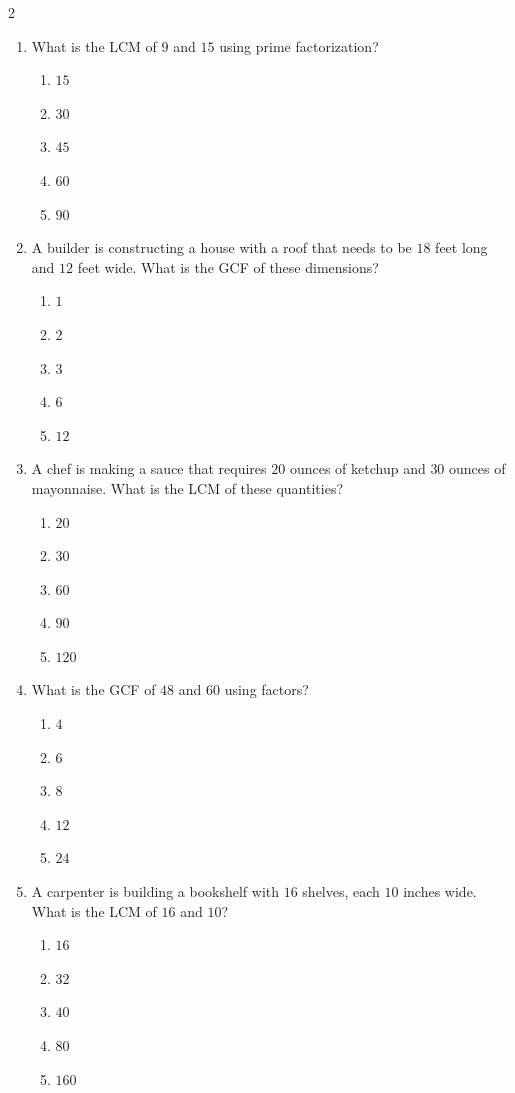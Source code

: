 \documentclass[10pt]{article}
\begin{document}
\begin{multicols}{2}
\begin{enumerate}[label=\textbf{Q\arabic*.}, leftmargin=*, itemsep=6pt, parsep=0pt]
  \item \small What is the LCM of $9$ and $15$ using prime factorization?
  \begin{enumerate}[label=(\Alph*), leftmargin=0.6cm, nosep, itemsep=2pt]
    \item $15$
    \item $30$
    \item $45$
    \item $60$
    \item $90$
  \end{enumerate}

  \item \small A builder is constructing a house with a roof that needs to be $18$ feet long and $12$ feet wide. What is the GCF of these dimensions?
  \begin{enumerate}[label=(\Alph*), leftmargin=0.6cm, nosep, itemsep=2pt]
    \item $1$
    \item $2$
    \item $3$
    \item $6$
    \item $12$
  \end{enumerate}

  \item \small A chef is making a sauce that requires $20$ ounces of ketchup and $30$ ounces of mayonnaise. What is the LCM of these quantities?
  \begin{enumerate}[label=(\Alph*), leftmargin=0.6cm, nosep, itemsep=2pt]
    \item $20$
    \item $30$
    \item $60$
    \item $90$
    \item $120$
  \end{enumerate}

  \item \small What is the GCF of $48$ and $60$ using factors?
  \begin{enumerate}[label=(\Alph*), leftmargin=0.6cm, nosep, itemsep=2pt]
    \item $4$
    \item $6$
    \item $8$
    \item $12$
    \item $24$
  \end{enumerate}

  \item \small A carpenter is building a bookshelf with $16$ shelves, each $10$ inches wide. What is the LCM of $16$ and $10$?
  \begin{enumerate}[label=(\Alph*), leftmargin=0.6cm, nosep, itemsep=2pt]
    \item $16$
    \item $32$
    \item $40$
    \item $80$
    \item $160$
  \end{enumerate}


\end{enumerate}
\end{multicols}
\end{document}
